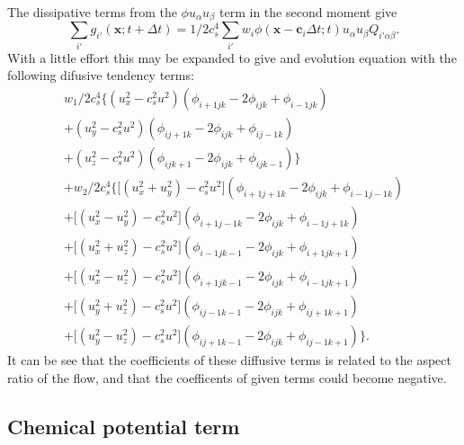 The dissipative terms from the $\phi u_\alpha u_\beta$ term in the
second moment give
\begin{equation}
\sum_{i'} g_{i'} (\mathbf{x}; t + \Delta t) =
1/2c_s^4 \sum_{i'} w_i \phi (\mathbf{x} - \mathbf{c}_i \Delta t; t)
u_\alpha u_\beta Q_{i'\alpha\beta}.
\end{equation}
With a little effort this may be expanded to give and evolution
equation with the following difusive tendency terms:
\begin{eqnarray}
w_1/2c_s^4  \Big\{
(u_x^2 - c_s^2u^2)(\phi_{i+1 j k} - 2\phi_{ijk} + \phi_{i-1 j k}) \\+
(u_y^2 - c_s^2u^2)(\phi_{i j+1 k} - 2\phi_{ijk} + \phi_{i j-1 k}) \\+
(u_z^2 - c_s^2u^2)(\phi_{i j k+1} - 2\phi_{ijk} + \phi_{i j k-1}) \Big\}\\
+ w_2/2c_s^4 \Big\{
\big[ (u_x^2 + u_y^2) - c_s^2u^2\big]
(\phi_{i+1 j+1 k} - 2\phi_{ijk} + \phi_{i-1 j-1 k}) \\+
\big[ (u_x^2 - u_y^2) - c_s^2u^2 \big]
(\phi_{i+1 j-1 k} - 2\phi_{ijk} + \phi_{i-1 j+1 k}) \\+
\big[ (u_x^2 + u_z^2) - c_s^2u^2 \big]
(\phi_{i-1 j k-1} - 2\phi_{ijk} + \phi_{i+1 j k+1}) \\+
\big[ (u_x^2 - u_z^2) - c_s^2u^2 \big]
(\phi_{i+1 j k-1} - 2\phi_{ijk} + \phi_{i-1 j k+1}) \\+
\big[ (u_y^2 + u_z^2) - c_s^2u^2 \big]
(\phi_{i j-1 k-1} -2\phi_{ijk} + \phi_{i j+1 k+1}) \\+
\big[ (u_y^2 - u_z^2) - c_s^2u^2 \big]
(\phi_{i j+1 k-1} - 2\phi_{ijk} + \phi_{i j-1 k+1}) \Big\}.
\end{eqnarray}
It can be see that the coefficients of these diffusive terms is
related to the aspect ratio of the flow, and that the coefficents
of given terms could become negative.

\subsection{Chemical potential term}

